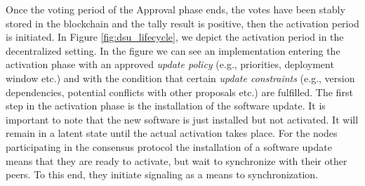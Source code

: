 Once the voting period of the Approval phase ends, the votes have been stably
stored in the blockchain and the tally result is positive, then the activation
period is initiated. In Figure \ref{fig:dsu_lifecycle}, we depict the
activation period in the decentralized setting.
In the figure we can see an implementation entering the activation phase with
an approved \emph{update policy} (e.g., priorities, deployment window etc.) and
with the condition that certain \emph{update constraints} (e.g., version
dependencies, potential conflicts with other proposals etc.) are fulfilled.
The first step in the activation phase is the installation of the software
update. It is important to note that the new software is just installed but not
activated. It will remain in a latent state until the actual activation takes
place. For the nodes participating in the consensus protocol the installation
of a software update means that they are ready to activate, but wait to
synchronize with their other peers. To this end, they initiate signaling as a
means to synchronization. %

